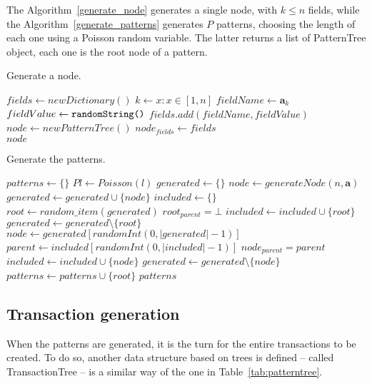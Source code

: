 \documentclass{acm_proc_article-sp-sigmod09}
\begin{document}
The Algorithm~\ref{generate_node} generates a single node, with $k \le n$ fields, while the Algorithm~\ref{generate_patterns} generates $P$ patterns, choosing the length of each one using a Poisson random variable. The latter returns a list of PatternTree object, each one is the root node of a pattern.

\begin{algorithm}
\caption{Generate a node.}
\label{generate_node}
\begin{algorithmic}[1]
\State $fields \gets new Dictionary()$
	\State $k \gets x : x \in [1, n]$
	\State $fieldName \gets \boldsymbol{a}_k$
	\State $fieldValue \gets \text{\texttt{randomString()}}$
	\State $fields.add(fieldName, fieldValue)$
\EndFor
\State $node \gets new PatternTree()$
\State $node_{fields} \gets fields$ \\
\Return $node$
\EndFunction
\end{algorithmic}
\end{algorithm}

\begin{algorithm}
\caption{Generate the patterns.}
\label{generate_patterns}
\begin{algorithmic}[1]
\State $patterns \gets \{\}$
	\State $Pl \gets Poisson(l)$
	\State $generated \gets \{\}$
		\State $node \gets generateNode(n, \boldsymbol{a}) $ 
		\State $generated \gets generated \cup \{node\}$
	\EndFor
	\State $included \gets \{\}$
	\State $root \gets random\_item(generated)$
	\State $root_{parent} = \bot$
	\State $included \gets included \cup \{root\}$
	\State $generated \gets generated \setminus \{root\}$
		\State $node \gets generated[randomInt(0, |generated| - 1)]$
		\State $parent \gets included[randomInt(0, |included| - 1)]$
		\State $node_{parent} = parent$
		\State $included \gets included \cup \{node\}$
		\State $generated \gets generated \setminus \{node\}$
	\EndFor
	\State $patterns \gets patterns \cup \{root\}$
\EndFor
\Return $patterns$
\EndFunction
\end{algorithmic}
\end{algorithm}

\subsection{Transaction generation}
When the patterns are generated, it is the turn for the entire transactions to be created. To do so, another data structure based on trees is defined -- called TransactionTree -- is a similar way of the one in Table~\ref{tab:patterntree}.
\end{document}
